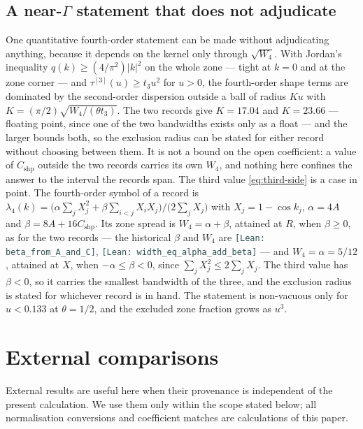\documentclass[11pt]{article}
\theoremstyle{plain}
\theoremstyle{definition}
\theoremstyle{remark}
\newcommand{\chk}[1]{}
\newcommand{\leanref}[1]{{\footnotesize\textcolor{DarkSlateGray}{\texttt{[Lean: #1]}}}}
\begin{document}
\subsection{A \texorpdfstring{near-$\Gamma$}{near-Gamma} statement that does not adjudicate}

One quantitative fourth-order statement can be made without adjudicating
anything, because it depends on the kernel only through $\sqrt{W_4}$. With
Jordan's inequality $q(k)\ge(4/\pi^2)|k|^2$ on the whole zone --- tight at
$k=0$ and at the zone corner --- and
$\tau^{[3]}(u)\ge t_3u^2$ for $u>0$, the
fourth-order shape terms are dominated by the second-order dispersion outside a
ball of radius $Ku$ with
$K=(\pi/2)\sqrt{W_4/(\theta t_3)}$. The two records give $K=17.04$ and
$K=23.66$ --- floating point, since one of the two bandwidths exists only as a
float --- and the larger bounds both, so the exclusion radius can be stated for
either record without choosing between them. It is not a bound on the open
coefficient: a value of $C_{\mathrm{shp}}$ outside the two records carries its
own $W_4$, and nothing here confines the answer to the interval the records
span. The third value \eqref{eq:third-side} is a case in point. The
fourth-order symbol of a record is
$\lambda_4(k)=\bigl(\alpha\sum_jX_j^2+\beta\sum_{i<j}X_iX_j\bigr)/\bigl(2\sum_jX_j\bigr)$
with $X_j=1-\cos k_j$, $\alpha=4A$ and $\beta=8A+16C_{\mathrm{shp}}$. Its
zone spread is $W_4=\alpha+\beta$, attained at $R$, when $\beta\ge0$, as for
the two records --- the historical $\beta$ and $W_4$ are
\leanref{beta\_from\_A\_and\_C}, \leanref{width\_eq\_alpha\_add\_beta} ---
and $W_4=\alpha=5/12$, attained at $X$, when $-\alpha\le\beta<0$, since
$\sum_jX_j^2\le2\sum_jX_j$. The third value has $\beta<0$, so it carries the
smallest bandwidth of the three, and the exclusion radius is stated for
whichever record is in hand. The statement is non-vacuous only for $u<0.133$ at $\theta=1/2$,
and the excluded zone fraction grows as $u^3$.
\chk{Jordan bound q(k) >= (4/pi\^{}2)|k|\^{}2 holds on the whole zone}
\chk{the criterion survives C2: K depends on the kernel only through sqrt(W\_4)}
\chk{the statement is non-vacuous only below an explicit coupling}

\section{External comparisons}
\label{sec:external}

External results are useful here when their provenance is independent of the
present calculation. We use them only within the scope stated below; all
normalisation conversions and coefficient matches are calculations of this
paper.
\end{document}
